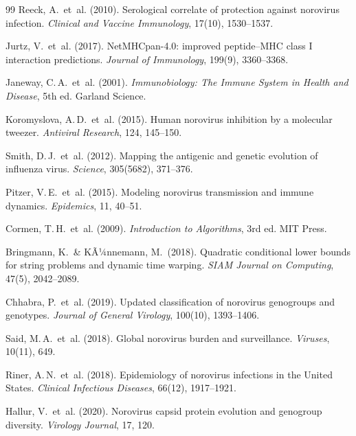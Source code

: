 ﻿\documentclass[a4paper,12pt]{article}
\theoremstyle{plain}
\theoremstyle{definition}
\theoremstyle{remark}
\begin{document}
\begin{thebibliography}{99}
Reeck, A.\ et~al. (2010).
Serological correlate of protection against norovirus infection.
\emph{Clinical and Vaccine Immunology}, 17(10), 1530--1537.

Jurtz, V.\ et~al. (2017).
NetMHCpan-4.0: improved peptide--MHC class I interaction predictions.
\emph{Journal of Immunology}, 199(9), 3360--3368.

Janeway, C.\,A.\ et~al. (2001).
\emph{Immunobiology: The Immune System in Health and Disease}, 5th ed.
Garland Science.

Koromyslova, A.\,D.\ et~al. (2015).
Human norovirus inhibition by a molecular tweezer.
\emph{Antiviral Research}, 124, 145--150.

Smith, D.\,J.\ et~al. (2012).
Mapping the antigenic and genetic evolution of influenza virus.
\emph{Science}, 305(5682), 371--376.

Pitzer, V.\,E.\ et~al. (2015).
Modeling norovirus transmission and immune dynamics.
\emph{Epidemics}, 11, 40--51.

Cormen, T.\,H.\ et~al. (2009).
\emph{Introduction to Algorithms}, 3rd ed.
MIT Press.

Bringmann, K.\ \& KÃ¼nnemann, M.\ (2018).
Quadratic conditional lower bounds for string problems and dynamic time warping.
\emph{SIAM Journal on Computing}, 47(5), 2042--2089.

Chhabra, P.\ et~al. (2019).
Updated classification of norovirus genogroups and genotypes.
\emph{Journal of General Virology}, 100(10), 1393--1406.

Said, M.\,A.\ et~al. (2018).
Global norovirus burden and surveillance.
\emph{Viruses}, 10(11), 649.

Riner, A.\,N.\ et~al. (2018).
Epidemiology of norovirus infections in the United States.
\emph{Clinical Infectious Diseases}, 66(12), 1917--1921.

Hallur, V.\ et~al. (2020).
Norovirus capsid protein evolution and genogroup diversity.
\emph{Virology Journal}, 17, 120.


\end{thebibliography}
\end{document}
